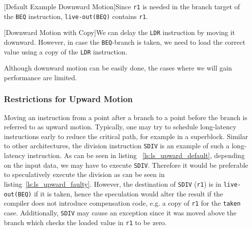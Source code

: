 \begin{center}
    \begin{minipage}{.45\textwidth}
        \centering
        
        \captionsetup{type=listing}
        [Default Example Downward Motion]{Since \texttt{r1} is needed in the branch target of the \texttt{BEQ} instruction, \texttt{live-out(BEQ)} contains \texttt{r1}.}
        \label{ls:ls_downward_default}
    \end{minipage}\hfill
    \begin{minipage}{.45\textwidth}
        \centering
        
        \captionsetup{type=listing}
        [Downward Motion with Copy]{We can delay the \texttt{LDR} instruction by moving it downward. However, in case the \texttt{BEQ}-branch is taken, we need to load the correct value using a copy of the \texttt{LDR} instruction.}
    \end{minipage}
\end{center}

Although downward motion can be easily done, the cases where we will gain performance are limited.

\subsubsection{Restrictions for Upward Motion}
Moving an instruction from a point after a branch to a point before the branch is referred to as upward motion. Typically, one may try to schedule long-latency instructions early to reduce the critical path, for example in a superblock. Similar to other architectures, the division instruction \texttt{SDIV} is an example of such a long-latency instruction. As can be seen in listing ~\ref{ls:ls_upward_default}, depending on the input data, we may have to execute \texttt{SDIV}. Therefore it would be preferable to speculatively execute the division as can be seen in listing~\ref{ls:ls_upward_faulty}. However, the destination of \texttt{SDIV} (\texttt{r1}) is in \texttt{live-out(BEQ)} if it is taken, hence the speculation would alter the result if the compiler does not introduce compensation code, e.g. a copy of \texttt{r1} for the \texttt{taken} case. Additionally, \texttt{SDIV} may cause an exception since it was moved above the branch which checks the loaded value in \texttt{r1} to be zero. 

